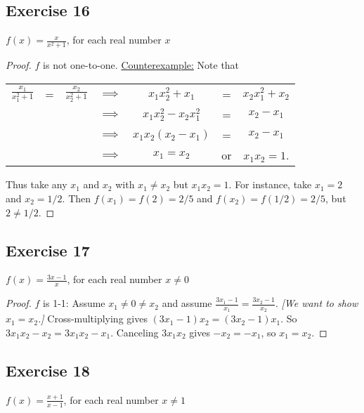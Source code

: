 \documentclass[14pt]{extarticle}
\newcommand{\dps}{\displaystyle}
\begin{document}
\subsection{Exercise 16}
\(\dps f(x) = \frac{x}{x^2+1}\), for each real number \(x\)

\begin{proof}
    $f$ is not one-to-one. \underline{Counterexample:} Note that

    \begin{center}
        \begin{tabular}{ccccccc}
            \(\dps\frac{x_1}{x_1^2+1}\) & = & \(\dps\frac{x_2}{x_2^2+1}\) & \(\implies\) & \(x_1x_2^2 + x_1\)      & =  & \(x_2x_1^2 + x_2\) \\
                                        &   &                             & \(\implies\) & \(x_1x_2^2 - x_2x_1^2\) & =  & \(x_2-x_1\)        \\
                                        &   &                             & \(\implies\) & \(x_1x_2(x_2-x_1)\)     & =  & \(x_2-x_1\)        \\
                                        &   &                             & \(\implies\) & \(x_1 = x_2\)           & or & \(x_1x_2 = 1\).
        \end{tabular}
    \end{center}

    Thus take any $x_1$ and $x_2$ with $x_1 \neq x_2$ but $x_1x_2 = 1$. For instance, take
    \(x_1 = 2\) and \(x_2 = 1/2\). Then \(f(x_1) = f(2) = 2/5\) and \(f(x_2) = f(1/2) = 2/5\), but $2 \neq 1/2$.
\end{proof}

\subsection{Exercise 17}
\(\dps f(x) = \frac{3x-1}{x}\), for each real number \(x \neq 0\)

\begin{proof}
    $f$ is 1-1: Assume \(x_1 \neq 0 \neq x_2\) and assume \(\frac{3x_1-1}{x_1} = \frac{3x_2-1}{x_2}\).
        {\it [We want to show \(x_1 = x_2\).]} Cross-multiplying gives \((3x_1-1)x_2 = (3x_2-1)x_1\). So
    \(3x_1x_2 - x_2 = 3x_1x_2 - x_1\). Canceling $3x_1x_2$ gives \(-x_2 = -x_1\), so \(x_1 = x_2\).
\end{proof}

\subsection{Exercise 18}
\(\dps f(x) = \frac{x+1}{x-1}\), for each real number \(x \neq 1\)
\end{document}
